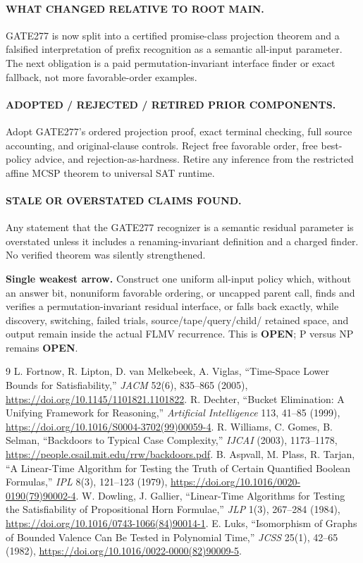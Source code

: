 \documentclass[11pt]{article}
\begin{document}
\paragraph{WHAT CHANGED RELATIVE TO ROOT MAIN.}
GATE277 is now split into a certified promise-class projection theorem and a
falsified interpretation of prefix recognition as a semantic all-input
parameter.  The next obligation is a paid permutation-invariant interface
finder or exact fallback, not more favorable-order examples.

\paragraph{ADOPTED / REJECTED / RETIRED PRIOR COMPONENTS.}
Adopt GATE277's ordered projection proof, exact terminal checking, full source
accounting, and original-clause controls.  Reject free favorable order, free
best-policy advice, and rejection-as-hardness.  Retire any inference from the
restricted affine MCSP theorem to universal SAT runtime.

\paragraph{STALE OR OVERSTATED CLAIMS FOUND.}
Any statement that the GATE277 recognizer is a semantic residual parameter is
overstated unless it includes a renaming-invariant definition and a charged
finder.  No verified theorem was silently strengthened.

\textbf{Single weakest arrow.}  Construct one uniform all-input policy which,
without an answer bit, nonuniform favorable ordering, or uncapped parent call,
finds and verifies a permutation-invariant residual interface, or falls back
exactly, while discovery, switching, failed trials, source/tape/query/child/
retained space, and output remain inside the actual FLMV recurrence.  This is
\textbf{OPEN}; P versus NP remains \textbf{OPEN}.

\begin{thebibliography}{9}
 L. Fortnow, R. Lipton, D. van Melkebeek, A. Viglas,
``Time-Space Lower Bounds for Satisfiability,'' \emph{JACM} 52(6), 835--865
(2005), \url{https://doi.org/10.1145/1101821.1101822}.
 R. Dechter, ``Bucket Elimination: A Unifying Framework for
Reasoning,'' \emph{Artificial Intelligence} 113, 41--85 (1999),
\url{https://doi.org/10.1016/S0004-3702(99)00059-4}.
 R. Williams, C. Gomes, B. Selman, ``Backdoors to Typical
Case Complexity,'' \emph{IJCAI} (2003), 1173--1178,
\url{https://people.csail.mit.edu/rrw/backdoors.pdf}.
 B. Aspvall, M. Plass, R. Tarjan, ``A Linear-Time Algorithm for
Testing the Truth of Certain Quantified Boolean Formulas,'' \emph{IPL} 8(3),
121--123 (1979), \url{https://doi.org/10.1016/0020-0190(79)90002-4}.
 W. Dowling, J. Gallier, ``Linear-Time Algorithms for Testing
the Satisfiability of Propositional Horn Formulae,'' \emph{JLP} 1(3), 267--284
(1984), \url{https://doi.org/10.1016/0743-1066(84)90014-1}.
 E. Luks, ``Isomorphism of Graphs of Bounded Valence Can Be
Tested in Polynomial Time,'' \emph{JCSS} 25(1), 42--65 (1982),
\url{https://doi.org/10.1016/0022-0000(82)90009-5}.
\end{thebibliography}
\end{document}
